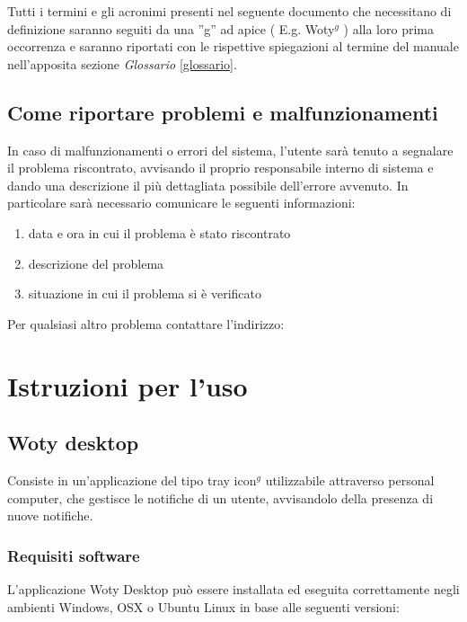 Tutti i termini e gli acronimi presenti nel seguente documento che necessitano di definizione saranno seguiti da una ''g'' ad apice ( E.g. Woty$^g$ ) alla loro prima occorrenza e saranno riportati con le rispettive spiegazioni al termine del manuale nell'apposita sezione \emph{Glossario} \ref{glossario}.




\subsection{Come riportare problemi e malfunzionamenti}
In caso di malfunzionamenti o errori del sistema, l'utente sarà tenuto a segnalare il problema riscontrato, avvisando il proprio responsabile interno di sistema e dando una descrizione il più dettagliata possibile dell'errore avvenuto.
In particolare sarà necessario comunicare le seguenti informazioni:

\begin{enumerate}
\item data e ora in cui il problema è stato riscontrato
\item descrizione del problema
\item situazione in cui il problema si è verificato
\end{enumerate}


Per qualsiasi altro problema contattare l'indirizzo: 







\section{Istruzioni per l'uso}



\subsection{Woty desktop}
\label{wd}
Consiste in un'applicazione del tipo tray icon$^g$ utilizzabile attraverso personal computer, che gestisce le notifiche di un utente, avvisandolo della presenza di nuove notifiche.

\subsubsection{Requisiti software}
L'applicazione Woty Desktop può essere installata ed eseguita correttamente negli ambienti Windows, OSX o Ubuntu Linux in base alle seguenti versioni:

